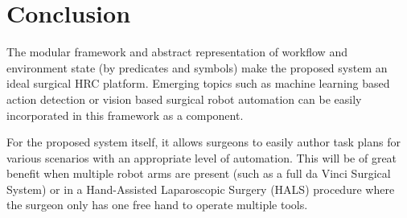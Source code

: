 \documentclass[letterpaper, 10 pt, conference]{ieeeconf}
\begin{document}
\section{Conclusion}
The modular framework and abstract representation of workflow and environment state (by predicates and symbols) make the proposed system an ideal surgical HRC platform. Emerging topics such as machine learning based action detection or vision based surgical robot automation can be easily incorporated in this framework as a component. 

For the proposed system itself, it allows surgeons to easily author task plans for various scenarios with an appropriate level of automation. This will be of great benefit when multiple robot arms are present (such as a full da Vinci Surgical System) or in a Hand-Assisted Laparoscopic Surgery (HALS) procedure \cite{bauzano2016collaborative} where the surgeon only has one free hand to operate multiple tools. 


\addtolength{\textheight}{-12cm}   %







%






\end{document}
